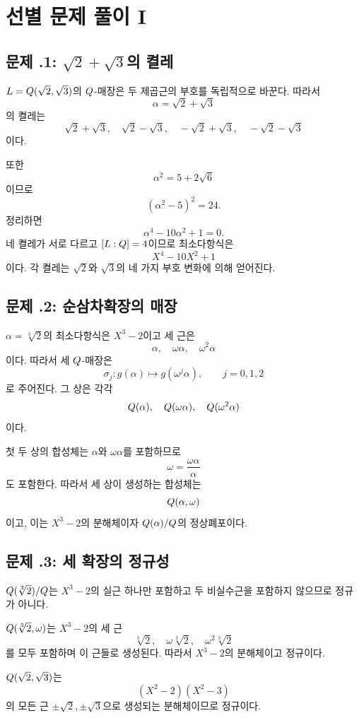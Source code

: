 \section{선별 문제 풀이 I}
\label{sec:normal-solutions-a}

\subsection*{문제 \thechapter.1: $\sqrt2+\sqrt3$의 켤레}

\begin{solution}
$L=Q(\sqrt2,\sqrt3)$의 $Q$-매장은 두 제곱근의 부호를 독립적으로 바꾼다. 따라서
\[
  \alpha=\sqrt2+\sqrt3
\]
의 켤레는
\[
  \sqrt2+\sqrt3,\quad
  \sqrt2-\sqrt3,\quad
  -\sqrt2+\sqrt3,\quad
  -\sqrt2-\sqrt3
\]
이다.

또한
\[
  \alpha^2=5+2\sqrt6
\]
이므로
\[
  (\alpha^2-5)^2=24.
\]
정리하면
\[
  \alpha^4-10\alpha^2+1=0.
\]
네 켤레가 서로 다르고 $[L:Q]=4$이므로 최소다항식은
\[
  X^4-10X^2+1
\]
이다. 각 켤레는 $\sqrt2$와 $\sqrt3$의 네 가지 부호 변화에 의해 얻어진다.
\end{solution}

\subsection*{문제 \thechapter.2: 순삼차확장의 매장}

\begin{solution}
$\alpha=\sqrt[3]{2}$의 최소다항식은 $X^3-2$이고 세 근은
\[
  \alpha,\quad\omega\alpha,\quad\omega^2\alpha
\]
이다. 따라서 세 $Q$-매장은
\[
  \sigma_j:g(\alpha)\longmapsto g(\omega^j\alpha),
  \qquad j=0,1,2
\]
로 주어진다. 그 상은 각각
\[
  Q(\alpha),\quad
  Q(\omega\alpha),\quad
  Q(\omega^2\alpha)
\]
이다.

첫 두 상의 합성체는 $\alpha$와 $\omega\alpha$를 포함하므로
\[
  \omega=\frac{\omega\alpha}{\alpha}
\]
도 포함한다. 따라서 세 상이 생성하는 합성체는
\[
  Q(\alpha,\omega)
\]
이고, 이는 $X^3-2$의 분해체이자 $Q(\alpha)/Q$의 정상폐포이다.
\end{solution}

\subsection*{문제 \thechapter.3: 세 확장의 정규성}

\begin{solution}
$Q(\sqrt[3]{2})/Q$는 $X^3-2$의 실근 하나만 포함하고 두 비실수근을 포함하지 않으므로 정규가 아니다.

$Q(\sqrt[3]{2},\omega)$는 $X^3-2$의 세 근
\[
  \sqrt[3]{2},\quad \omega\sqrt[3]{2},\quad
  \omega^2\sqrt[3]{2}
\]
를 모두 포함하며 이 근들로 생성된다. 따라서 $X^3-2$의 분해체이고 정규이다.

$Q(\sqrt2,\sqrt3)$는
\[
  (X^2-2)(X^2-3)
\]
의 모든 근 $\pm\sqrt2,\pm\sqrt3$으로 생성되는 분해체이므로 정규이다.
\end{solution}

